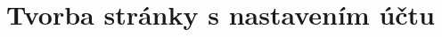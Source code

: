 \fancyhf{}
\rfoot{\helv \thepage}

\chapter{Tvorba stránky s nastavením účtu}


\newpage

\newpage

\newpage

\newpage
